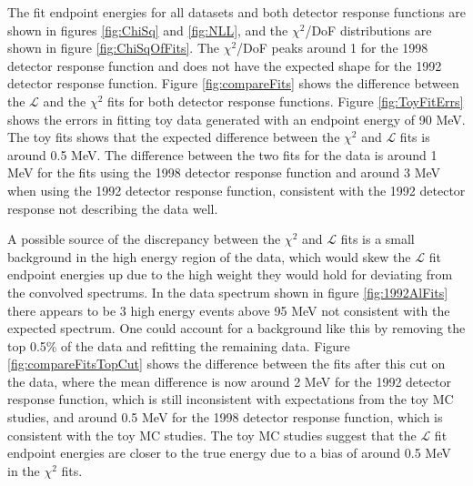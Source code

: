 The fit endpoint energies for all 
datasets and both detector response functions are shown in figures \ref{fig:ChiSq} and \ref{fig:NLL}, and the $\chi^2$/DoF
distributions are shown in figure \ref{fig:ChiSqOfFits}. 
The $\chi^2$/DoF peaks around 1 for the 1998 detector response 
function and does not have the expected shape for the 1992 detector response function. Figure \ref{fig:compareFits}
shows the difference between the $\mathcal{L}$ and the $\chi^2$ fits for both detector response functions.
Figure \ref{fig:ToyFitErrs} shows the errors in fitting toy data generated with
an endpoint energy of 90 MeV. The toy fits shows that the expected difference between the $\chi^2$ and $\mathcal{L}$ fits 
is around 0.5 MeV. The difference between the two fits for the data is around 1 MeV for the fits using the 1998 detector 
response function and around 3 MeV when using the 1992 detector response function, consistent with the 1992 detector response 
not describing the data well. 

A possible source of the discrepancy between the $\chi^2$ and $\mathcal{L}$ fits is a small background 
in the high energy region of the data, which would skew the $\mathcal{L}$ fit endpoint energies up due to the high weight they would hold for deviating
from the convolved spectrums. In the data spectrum shown in figure \ref{fig:1992AlFits} there appears to be 3 high energy events above 95 MeV
not consistent with the expected spectrum. One could account for a background like this by removing the top 0.5\% of the data and refitting the remaining
data. Figure \ref{fig:compareFitsTopCut} shows the difference between the fits after this cut on the data, where the 
mean difference is now around 2 MeV for the 1992 detector response function, which is still inconsistent with expectations from
the toy MC studies, and around 0.5 MeV for the 1998 detector response function, which is consistent with the toy MC studies.
The toy MC studies suggest that the $\mathcal{L}$ fit endpoint energies are closer to the true energy due to a bias of around 0.5 MeV 
in the $\chi^2$ fits.


